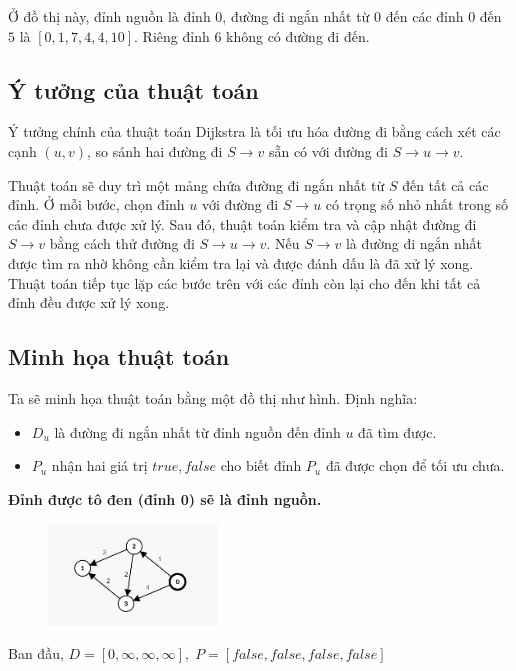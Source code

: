  Ở đồ thị này, đỉnh nguồn là đỉnh $0$, đường đi ngắn nhất từ $0$ đến các đỉnh $0$ đến $5$ là $[0, 1, 7, 4, 4, 10]$. Riêng đỉnh $6$ không có đường đi đến.

\subsection{Ý tưởng của thuật toán}

Ý tưởng chính của thuật toán Dijkstra là tối ưu hóa đường đi bằng cách xét các cạnh $(u, v)$, so sánh hai đường đi $S \to v$ sẵn có với đường đi $S \to u \to v$.

Thuật toán sẽ duy trì một mảng chứa đường đi ngắn nhất từ $S$ đến tất cả các đỉnh. Ở mỗi bước, chọn đỉnh $u$ với đường đi $S \to u$ có trọng số nhỏ nhất trong số các đỉnh chưa được xử lý. Sau đó, thuật toán kiểm tra và cập nhật đường đi $S \to v$ bằng cách thử đường đi $S \to u \to v$. Nếu $S \to v$ là đường đi ngắn nhất được tìm ra nhờ không cần kiểm tra lại và được đánh dấu là đã xử lý xong. Thuật toán tiếp tục lặp các bước trên với các đỉnh còn lại cho đến khi tất cả đỉnh đều được xử lý xong.

\subsection{Minh họa thuật toán}

Ta sẽ minh họa thuật toán bằng một đồ thị như hình. Định nghĩa:
\begin{itemize}
    \item $D_u$ là đường đi ngắn nhất từ đỉnh nguồn đến đỉnh $u$ đã tìm được.
    \item $P_u$ nhận hai giá trị $true, false$ cho biết đỉnh $P_u$ đã được chọn để tối ưu chưa.
\end{itemize}

\textbf{Đỉnh được tô đen (đỉnh 0) sẽ là đỉnh nguồn.}

\begin{figure}[h]
    \centering
    \includegraphics[width=0.4\textwidth]{resource/img/b7/dijkstra_2.png}
\end{figure}
Ban đầu, $D = [0, \infty, \infty, \infty],\; P = [false, false, false, false]$

